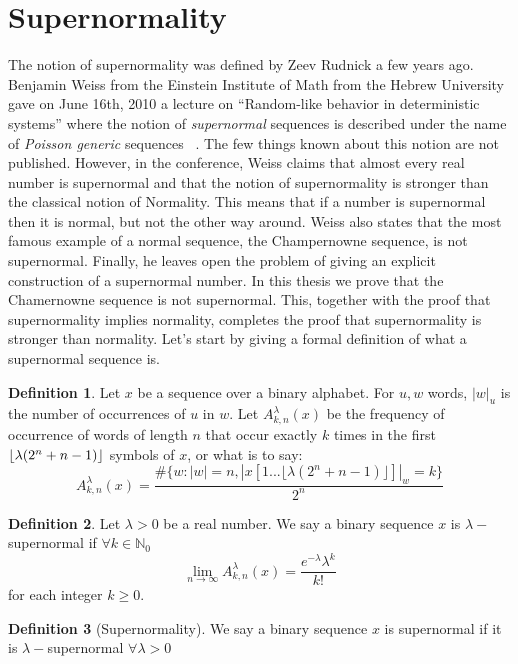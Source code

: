 \documentclass[11pt,a4paper]{tesis}
\theoremstyle{definition}
\newtheorem{definition}{Definition}[section]
\DeclarePairedDelimiter{\floor}{\lfloor}{\rfloor}
\begin{document}
\section{Supernormality}

The notion of supernormality was defined by Zeev Rudnick a few years ago. 
Benjamin Weiss from the Einstein Institute of Math from the Hebrew University gave on June 16th, 2010 a lecture on “Random-like behavior in deterministic systems”  where the notion of \textit{supernormal} sequences is described under the name of \textit{Poisson generic} sequences ~\cite{Weiss}.
 The few things known about this notion are not published. However, in the conference, Weiss claims that almost every real number is supernormal and that the notion of supernormality is stronger than the classical notion of Normality. This means that if a number is supernormal then it is normal, but not the other way around. 
Weiss also states that the most famous example of a normal sequence, the Champernowne sequence, is not supernormal.
Finally, he leaves open the problem of giving an explicit construction of a supernormal number.
In this thesis we prove that the Chamernowne sequence is not supernormal. This, together with the proof that supernormality implies normality, completes the proof that supernormality is stronger than normality.
Let's start by giving a formal definition of what a supernormal sequence is.
\\


\begin{definition}
Let $x$ be a sequence over a binary alphabet.
For $u,w$ words, $|w|_u$ is the number of occurrences of $u$ in $w$.
Let $A^\lambda_{k,n}(x)$ be the frequency of occurrence of words of length $n$ that occur exactly $k$ times in the first $\floor{\lambda(2^n+n-1)}$ symbols of $x$, or what is to say:
$$A^\lambda_{k,n}(x) = \frac{\#\{w: |w| = n  , |x[1...\lfloor\lambda(2^n+n-1)\rfloor]|_w = k\}}{2^n}$$
\end{definition}


\begin{definition}
    Let $\lambda > 0$ be a real number. We say a binary sequence $x$ is $\lambda-$supernormal if $\forall k \in \mathds{N}_{0}$ $$\lim_{n\to\infty} A^\lambda_{k,n}(x) = \frac{e^{-\lambda}\lambda^k}{k!}$$ for each integer $k \geq 0$.
\end{definition}

\begin{definition}[Supernormality]
    We say a binary sequence $x$ is supernormal if it is $\lambda-$supernormal $\forall \lambda > 0$
\end{definition}
\end{document}
